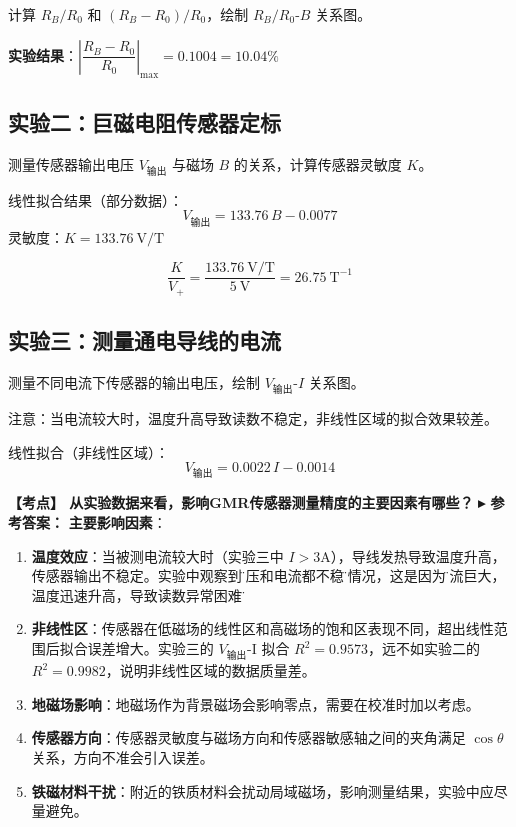 \documentclass[12pt,a4paper]{article}
\newcommand{\hl}[1]{\textbf{\color{red}#1}}
\newcommand{\exam}[1]{\textbf{\color{blue!70!black}【考点】#1}}
\newcommand{\answer}[1]{\vspace{2pt}\noindent\textbf{\color{teal!80!black}▸ 参考答案：}#1\vspace{4pt}}
\newcommand{\qa}[2]{\exam{#1}\answer{#2}}
\begin{document}
计算 \(R_B/R_0\) 和 \((R_B-R_0)/R_0\)，绘制 \(R_B/R_0\)-\(B\) 关系图。

\hl{实验结果}：\(\left|\dfrac{R_B-R_0}{R_0}\right|_{\max} = 0.1004 = 10.04\%\)

\subsection{实验二：巨磁电阻传感器定标}
测量传感器输出电压 \(V_{\text{输出}}\) 与磁场 \(B\) 的关系，计算传感器灵敏度 \(K\)。

线性拟合结果（部分数据）：
\begin{equation}
    V_{\text{输出}} = 133.76\,B - 0.0077
\end{equation}
灵敏度：\(K = 133.76\ \text{V/T}\)

\begin{equation}
    \frac{K}{V_+} = \frac{133.76\ \text{V/T}}{5\ \text{V}} = 26.75\ \text{T}^{-1}
\end{equation}

\subsection{实验三：测量通电导线的电流}
测量不同电流下传感器的输出电压，绘制 \(V_{\text{输出}}\)-\(I\) 关系图。

注意：当电流较大时，温度升高导致读数不稳定，非线性区域的拟合效果较差。

线性拟合（非线性区域）：
\begin{equation}
    V_{\text{输出}} = 0.0022\,I - 0.0014
\end{equation}

\qa{
    从实验数据来看，影响GMR传感器测量精度的主要因素有哪些？
}{
    \textbf{主要影响因素}：
    \begin{enumerate}
        \item \textbf{温度效应}：当被测电流较大时（实验三中 $I>3$A），导线发热导致温度升高，传感器输出不稳定。实验中观察到\"电压和电流都不稳\"的情况，这是因为\"电流巨大，温度迅速升高，导致读数异常困难\"。
        \item \textbf{非线性区}：传感器在低磁场的线性区和高磁场的饱和区表现不同，超出线性范围后拟合误差增大。实验三的 $V_{\text{输出}}$-I 拟合 $R^2=0.9573$，远不如实验二的 $R^2=0.9982$，说明非线性区域的数据质量差。
        \item \textbf{地磁场影响}：地磁场作为背景磁场会影响零点，需要在校准时加以考虑。
        \item \textbf{传感器方向}：传感器灵敏度与磁场方向和传感器敏感轴之间的夹角满足 $\cos\theta$ 关系，方向不准会引入误差。
        \item \textbf{铁磁材料干扰}：附近的铁质材料会扰动局域磁场，影响测量结果，实验中应尽量避免。
    \end{enumerate}
}
\end{document}
